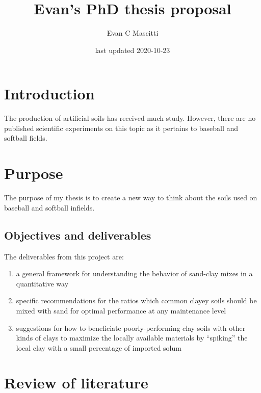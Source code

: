\documentclass[
]{book}
\title{Evan's PhD thesis proposal}
\author{Evan C Mascitti}
\date{last updated 2020-10-23}
\providecommand{\tightlist}{%
  \setlength{\itemsep}{0pt}\setlength{\parskip}{0pt}}
\begin{document}
\maketitle

{
\setcounter{tocdepth}{1}
\tableofcontents
}
\hypertarget{introduction}{%
\chapter{Introduction}\label{introduction}}

The production of artificial soils has received much study. However, there are
no published scientific experiments on this topic as it pertains to baseball and
softball fields.

\hypertarget{purpose}{%
\chapter{Purpose}\label{purpose}}

The purpose of my thesis is to create a new way to think about the soils used on baseball and softball infields.

\hypertarget{objectives-and-deliverables}{%
\section{Objectives and deliverables}\label{objectives-and-deliverables}}

The deliverables from this project are:

\begin{enumerate}
\def\labelenumi{\arabic{enumi}.}
\tightlist
\item
  a general framework for understanding the behavior of sand-clay mixes in a quantitative way
\item
  specific recommendations for the ratios which common clayey soils should be mixed with sand for optimal performance at any maintenance level
\item
  suggestions for how to beneficiate poorly-performing clay soils with other kinds of clays to maximize the locally available materials by ``spiking'' the local clay with a small percentage of imported solum
\end{enumerate}

\hypertarget{review-of-literature}{%
\chapter{Review of literature}\label{review-of-literature}}
\end{document}

